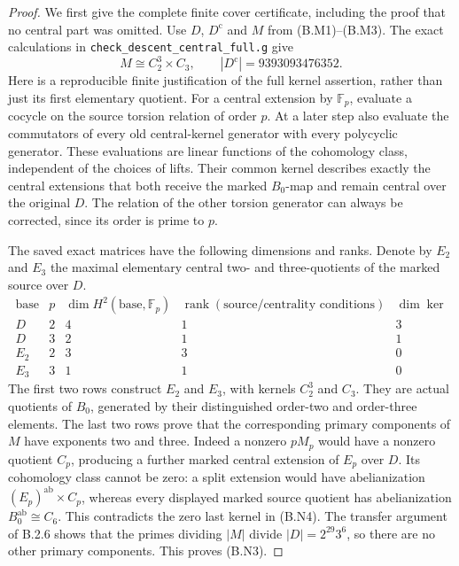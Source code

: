\begin{proof}
We first give the complete finite cover certificate,
including the proof that no central part was omitted.
Use $D$, $D^{\mathrm c}$ and $M$ from (B.M1)--(B.M3).
The exact calculations in
\texttt{check\_descent\_central\_full.g} give
\[
 M\cong C_2^3\times C_3,
 \qquad |D^{\mathrm c}|=9393093476352.           \tag{B.N3}
\]
Here is a reproducible finite justification of the full
kernel assertion, rather than just its first elementary
quotient.  For a central extension by $\mathbb F_p$,
evaluate a cocycle on the source torsion relation of
order $p$.  At a later step also evaluate the commutators
of every old central-kernel generator with every
polycyclic generator.  These evaluations are linear
functions of the cohomology class, independent of the
choices of lifts.  Their common kernel describes exactly
the central extensions that both receive the marked
$B_0$-map and remain central over the original $D$.
The relation of the other torsion generator can always
be corrected, since its order is prime to $p$.

The saved exact matrices have the following dimensions
and ranks.  Denote by $E_2$ and $E_3$ the maximal
elementary central two- and three-quotients of the
marked source over $D$.
\[
\begin{array}{c|c|c|c|c}
 \text{base}&p&\dim H^2(\text{base},\mathbb F_p)
       &\operatorname{rank}(\text{source/centrality conditions})
       &\dim\ker\\ \hline
 D&2&4&1&3\\
 D&3&2&1&1\\
 E_2&2&3&3&0\\
 E_3&3&1&1&0
\end{array}                                             \tag{B.N4}
\]
The first two rows construct $E_2$ and $E_3$, with
kernels $C_2^3$ and $C_3$.  They are actual quotients of
$B_0$, generated by their distinguished order-two and
order-three elements.  The last two rows prove that the
corresponding primary components of $M$ have exponents
two and three.  Indeed a nonzero $pM_p$ would have a
nonzero quotient $C_p$, producing a further marked
central extension of $E_p$ over $D$.  Its cohomology
class cannot be zero: a split extension would have
abelianization $(E_p)^{\mathrm{ab}}\times C_p$, whereas
every displayed marked source quotient has
abelianization $B_0^{\mathrm{ab}}\cong C_6$.
This contradicts the zero last kernel in (B.N4).
The transfer argument of B.2.6 shows that the primes
dividing $|M|$ divide $|D|=2^{29}3^6$, so there are no
other primary components.  This proves (B.N3).


\end{proof}

